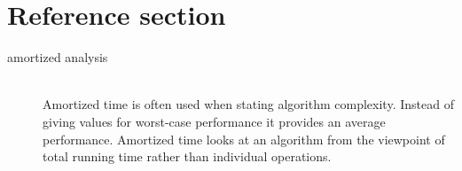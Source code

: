 \documentclass{article}
\begin{document}
\pagebreak
\section*{Reference section} \label{sec:reference}
\begin{description}
	\item[amortized analysis] \hfill \\ Amortized time is often used when stating algorithm complexity. Instead of giving values for worst-case performance it provides an average performance. Amortized time looks at an algorithm from the viewpoint of total running time rather than individual operations.
\end{description}
\end{document}
